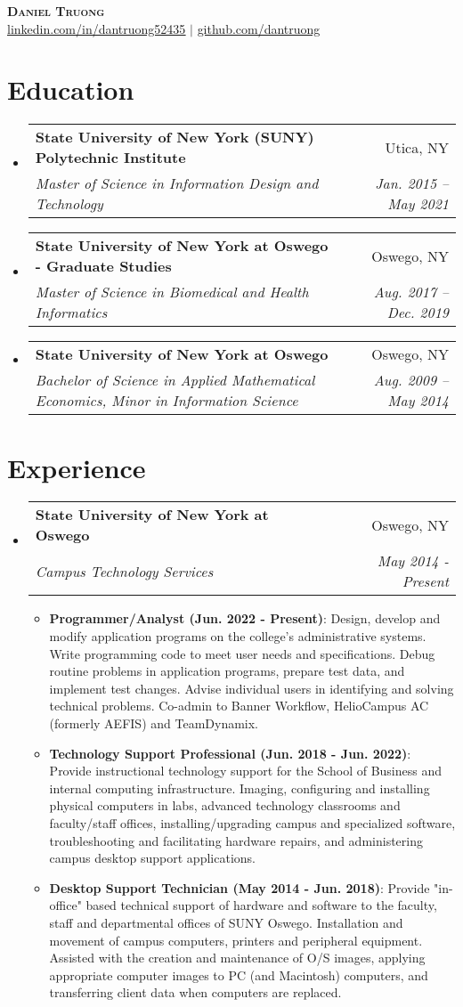 \documentclass[letterpaper,11pt]{article}
\makeatletter
\newcommand{\resumeItem}[2]{
  \item\small{
    \textbf{#1}{: #2 \vspace{-2pt}}
  }
}
\newcommand{\resumeSubheading}[4]{
  \vspace{-1pt}\item
    \begin{tabular*}{0.97\textwidth}[t]{l@{\extracolsep{\fill}}r}
      \textbf{#1} & #2 \\
      \textit{\small#3} & \textit{\small #4} \\
    \end{tabular*}\vspace{-5pt}
}
\newcommand{\resumeSubHeadingListStart}{\begin{itemize}[leftmargin=*]}
\newcommand{\resumeSubHeadingListEnd}{\end{itemize}}
\newcommand{\resumeItemListStart}{\begin{itemize}}
\newcommand{\resumeItemListEnd}{\end{itemize}\vspace{-5pt}}
\makeatother
\begin{document}

\begin{center}
    \textbf{\Huge \scshape Daniel Truong} \\ \vspace{1pt}
    \href{https://linkedin.com/in/dantruong52435}{\underline{linkedin.com/in/dantruong52435}} $|$
    \href{https://github.com/dantruong}{\underline{github.com/dantruong}}
\end{center}

\section{Education}
  	\resumeSubHeadingListStart
    		\resumeSubheading
      		{State University of New York (SUNY) Polytechnic Institute}{Utica, NY}
      		{Master of Science in Information Design and Technology}{Jan. 2015 -- May  2021}
			\resumeSubheading
      		{State University of New York at Oswego - Graduate Studies}{Oswego, NY}
      		{Master of Science in Biomedical and Health Informatics}{Aug. 2017 -- Dec. 2019}
    		\resumeSubheading
      		{State University of New York at Oswego}{Oswego, NY}
      		{Bachelor of Science in Applied Mathematical Economics, Minor in Information Science}{Aug. 2009 -- May 2014}
  	\resumeSubHeadingListEnd

\section{Experience}
  	\resumeSubHeadingListStart
    	\resumeSubheading
      		{State University of New York at Oswego}{Oswego, NY}
      		{Campus Technology Services}{May 2014 - Present}
      		\resumeItemListStart
				\resumeItem{Programmer/Analyst (Jun. 2022 - Present)}
				{Design, develop and modify application programs on the college's administrative systems. Write programming code to meet user needs and specifications. Debug routine problems in application programs, prepare test data, and implement test changes. Advise individual users in identifying and solving technical problems. Co-admin to Banner Workflow, HelioCampus AC (formerly AEFIS) and TeamDynamix.}
				\resumeItem{Technology Support Professional (Jun. 2018 - Jun. 2022)}
				{Provide instructional technology support for the School of Business and internal computing infrastructure. Imaging, configuring and installing physical computers in labs, advanced technology classrooms and faculty/staff offices, installing/upgrading campus and specialized software,  troubleshooting and facilitating hardware repairs, and administering campus desktop support applications.}
				\resumeItem{Desktop Support Technician (May 2014 - Jun. 2018)}
				{Provide "in-office" based technical support of hardware and software to the faculty, staff and departmental offices of SUNY Oswego. Installation and movement of campus computers, printers and peripheral equipment. Assisted with the creation and maintenance of O/S images, applying appropriate computer images to PC (and Macintosh) computers, and transferring client data when computers are replaced.}
      		\resumeItemListEnd
  	\resumeSubHeadingListEnd
\end{document}

